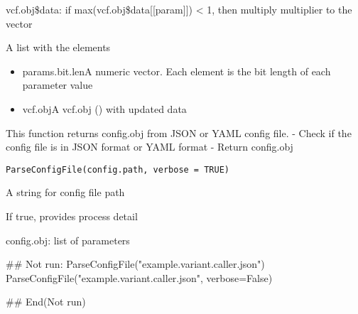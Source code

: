 \documentclass[letterpaper]{book}
\begin{document}
%
\begin{Details}\relax
vcf.obj\$data: if max(vcf.obj\$data[[param]]) < 1, then multiply multiplier to the vector
\end{Details}
%
\begin{Value}
A list with the elements
\begin{itemize}

\item{} params.bit.lenA numeric vector. Each element is the bit length of each parameter value
\item{} vcf.objA vcf.obj () with updated data

\end{itemize}

\end{Value}
%
\begin{Description}\relax
This function returns config.obj from JSON or YAML config file.
- Check if the config file is in JSON format or YAML format
- Return config.obj
\end{Description}
%
\begin{Usage}
\begin{verbatim}
ParseConfigFile(config.path, verbose = TRUE)
\end{verbatim}
\end{Usage}
%
\begin{Arguments}
\begin{ldescription}
\item[\code{config.path}] A string for config file path

\item[\code{verbose}] If true, provides process detail
\end{ldescription}
\end{Arguments}
%
\begin{Value}
config.obj: list of parameters
\end{Value}
%
\begin{Examples}
\begin{ExampleCode}
## Not run: 
ParseConfigFile("example.variant.caller.json")
ParseConfigFile("example.variant.caller.json", verbose=False)

## End(Not run)
\end{ExampleCode}
\end{Examples}
\end{document}
